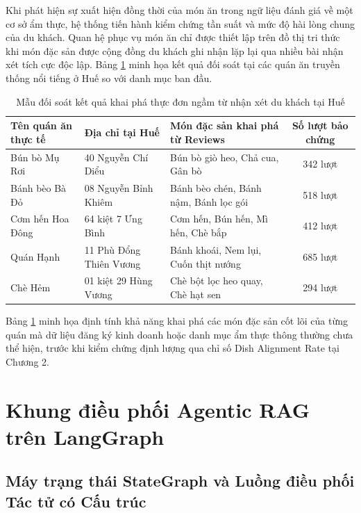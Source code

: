 Khi phát hiện sự xuất hiện đồng thời của món ăn trong ngữ liệu đánh giá về một cơ sở ẩm thực, hệ thống tiến hành kiểm chứng tần suất và mức độ hài lòng chung của du khách. Quan hệ phục vụ món ăn chỉ được thiết lập trên đồ thị tri thức khi món đặc sản được cộng đồng du khách ghi nhận lặp lại qua nhiều bài nhận xét tích cực độc lập. Bảng \ref{tab:mined-dishes-sample} minh họa kết quả đối soát tại các quán ăn truyền thống nổi tiếng ở Huế so với danh mục ban đầu.

\begin{table}[H]
\centering
\caption{Mẫu đối soát kết quả khai phá thực đơn ngầm từ nhận xét du khách tại Huế}
\label{tab:mined-dishes-sample}
\small
\begin{tabularx}{\textwidth}{l l >{\raggedright\arraybackslash}X c}
\hline
\textbf{Tên quán ăn thực tế} & \textbf{Địa chỉ tại Huế} & \textbf{Món đặc sản khai phá từ Reviews} & \textbf{Số lượt bảo chứng} \\
\hline
Bún bò Mụ Rơi & 40 Nguyễn Chí Diểu & Bún bò giò heo, Chả cua, Gân bò & 342 lượt \\
Bánh bèo Bà Đỏ & 08 Nguyễn Bỉnh Khiêm & Bánh bèo chén, Bánh nậm, Bánh lọc gói & 518 lượt \\
Cơm hến Hoa Đông & 64 kiệt 7 Ưng Bình & Cơm hến, Bún hến, Mì hến, Chè bắp & 412 lượt \\
Quán Hạnh & 11 Phù Đổng Thiên Vương & Bánh khoái, Nem lụi, Cuốn thịt nướng & 685 lượt \\
Chè Hẻm & 01 kiệt 29 Hùng Vương & Chè bột lọc heo quay, Chè hạt sen & 294 lượt \\
\hline
\end{tabularx}
\end{table}

Bảng \ref{tab:mined-dishes-sample} minh họa định tính khả năng khai phá các món đặc sản cốt lõi của từng quán mà dữ liệu đăng ký kinh doanh hoặc danh mục ẩm thực thông thường chưa thể hiện, trước khi kiểm chứng định lượng qua chỉ số Dish Alignment Rate tại Chương 2.

\section{Khung điều phối Agentic RAG trên LangGraph}
\label{sec:ch1-langgraph}

\subsection{Máy trạng thái StateGraph và Luồng điều phối Tác tử có Cấu trúc}
\label{subsec:ch1-stategraph}

